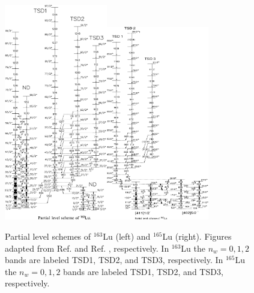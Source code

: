 \begin{figure}[ht!]
\centerline{\includegraphics[width=0.4\textwidth]{./img/c1/163Lu_scheme.png}\hspace{0.1\textwidth}\includegraphics[width=0.4\textwidth]{./img/c1/165Lu_scheme.png}}
	\caption{Partial level schemes of $^{163}$Lu (left) and $^{165}$Lu (right). Figures adapted from Ref. \cite{wobblingIn163LuTwoPhonon} and Ref. \cite{wobblingIn165Lu}, respectively. In $^{163}$Lu the $n_w=0,1,2$ bands are labeled TSD1, TSD2, and TSD3, respectively. In $^{165}$Lu the $n_w=0,1,2$ bands are labeled TSD1, TSD2, and TSD3, respectively. \label{fig:chp1-first-wobb}}
\end{figure}

